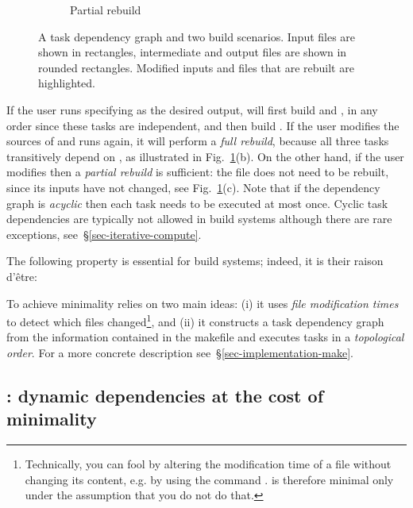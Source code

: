 \begin{figure}[h]
\begin{subfigure}[b]{0.32\linewidth}
\caption{Partial rebuild}
\end{subfigure}
\vspace{-2mm}
\caption{A task dependency graph and two build scenarios. Input files are shown
in rectangles, intermediate and output files are shown in rounded rectangles.
Modified inputs and files that are rebuilt are highlighted.
\label{fig-make}}
\vspace{-2mm}
\end{figure}

If the user runs \Make specifying  as the desired output, \Make
will first build  and , in any order since these
tasks are independent, and then build . If the
user modifies the sources of  and runs \Make again, it will
perform a \emph{full rebuild}, because all three tasks transitively depend on
, as illustrated in Fig.~\ref{fig-make}(b). On the other hand, if
the user modifies  then a \emph{partial rebuild} is sufficient:
the file  does not need to be rebuilt, since its inputs have not
changed, see Fig.~\ref{fig-make}(c). Note that if the dependency graph is
\emph{acyclic} then each task needs to be executed at most once. Cyclic task
dependencies are typically not allowed in build systems although there are rare
exceptions, see~\S\ref{sec-iterative-compute}.

The following property is essential for build systems; indeed, it is their raison d'\^etre:

\label{def-minimal}
\vspace{2mm}

To achieve minimality \Make relies on two main ideas: (i) it uses \emph{file
modification times} to detect which files changed\footnote{Technically, you
can fool \Make by altering the modification time of a file without changing its
content, e.g. by using the command . \Make is therefore minimal only
under the assumption that you do not do that.}, and (ii) it constructs a task
dependency graph from the information contained in the makefile and executes
tasks in a \emph{topological order}. For a more concrete description
see~\S\ref{sec-implementation-make}.

\subsection{\Excel: dynamic dependencies at the cost of minimality}
\label{sec-background-excel}

